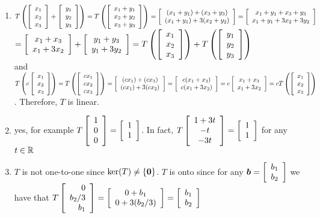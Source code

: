 \begin{enumerate}[!HW!, start=1]
\item $T\left(\vr{x_1\\x_2\\x_3} + \vr{y_1\\y_2\\y_3}\right) = T\left(\vr{x_1+y_1\\x_2+y_2\\x_3+y_3}\right) = \mtx{c}{(x_1+y_1) + (x_3+y_3) \\ (x_1+y_1) + 3(x_2+y_2)} = \mtx{c}{x_1+y_1 + x_3+y_3 \\ x_1+y_1 + 3x_2+3y_2}$\\ $= \mtx{c}{x_1+x_3\\x_1+3x_2} + \mtx{c}{y_1+y_3\\y_1+3y_2} = T\left(\vr{x_1\\x_2\\x_3}\right) + T\left(\vr{y_1\\y_2\\y_3}\right)$\\ and\\ $T\left(c\vr{x_1\\x_2\\x_3}\right) = T\left(\vr{cx_1\\cx_2\\cx_3}\right) = \mtx{c}{(cx_1)+(cx_3) \\ (cx_1) + 3(cx_2)} = \mtx{c}{c(x_1+x_3) \\ c(x_1+3x_2)} = c\mtx{c}{x_1+x_3\\x_1+3x_2} = cT\left(\vr{x_1\\x_2\\x_3}\right)$. Therefore, $T$ is linear.
\item yes, for example $T\vr{1\\0\\0} = \vr{1\\1}$. In fact, $T\mtx{c}{1+3t\\-t\\-3t} = \vr{1\\1}$ for any $t\in \R$
\item $T$ is not one-to-one since $\ker(T)\neq \{\bb 0\}$. $T$ is onto since for any $\bb b = \vr{b_1\\b_2}$ we have that $T\vr{0\\b_2/3\\b_1} = \mtx{c}{0+b_1 \\ 0+3(b_2/3)} = \vr{b_1\\b_2}$


\end{enumerate}
